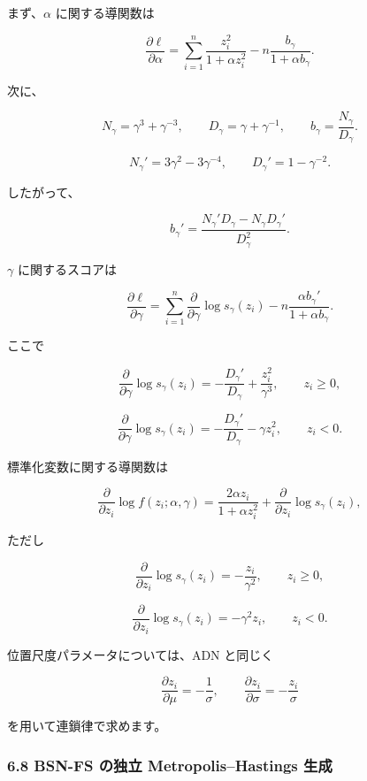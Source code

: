 \documentclass[
]{article}
\begin{document}
まず、\(\alpha\) に関する導関数は

\[
\frac{\partial \ell}{\partial \alpha}
=\sum_{i=1}^{n}\frac{z_i^2}{1+\alpha z_i^2}
-n\frac{b_\gamma}{1+\alpha b_\gamma}.
\]

次に、

\[
N_\gamma=\gamma^3+\gamma^{-3},
\qquad
D_\gamma=\gamma+\gamma^{-1},
\qquad
b_\gamma=\frac{N_\gamma}{D_\gamma}.
\]

\[
N_\gamma'=3\gamma^2-3\gamma^{-4},
\qquad
D_\gamma'=1-\gamma^{-2}.
\]

したがって、

\[
b_\gamma'
=\frac{N_\gamma'D_\gamma-N_\gamma D_\gamma'}{D_\gamma^2}.
\]

\(\gamma\) に関するスコアは

\[
\frac{\partial \ell}{\partial \gamma}
=\sum_{i=1}^{n}\frac{\partial}{\partial\gamma}\log s_\gamma(z_i)
-n\frac{\alpha b_\gamma'}{1+\alpha b_\gamma}.
\]

ここで

\[
\frac{\partial}{\partial\gamma}\log s_\gamma(z_i)
= -\frac{D_\gamma'}{D_\gamma}+\frac{z_i^2}{\gamma^3},
\qquad z_i\ge0,
\]

\[
\frac{\partial}{\partial\gamma}\log s_\gamma(z_i)
= -\frac{D_\gamma'}{D_\gamma}-\gamma z_i^2,
\qquad z_i<0.
\]

標準化変数に関する導関数は

\[
\frac{\partial}{\partial z_i}\log f(z_i;\alpha,\gamma)
=\frac{2\alpha z_i}{1+\alpha z_i^2}
+\frac{\partial}{\partial z_i}\log s_\gamma(z_i),
\]

ただし

\[
\frac{\partial}{\partial z_i}\log s_\gamma(z_i)=
-\frac{z_i}{\gamma^2},\qquad z_i\ge0,
\]

\[
\frac{\partial}{\partial z_i}\log s_\gamma(z_i)=
-\gamma^2 z_i,
\qquad z_i<0.
\]

位置尺度パラメータについては、ADN と同じく

\[
\frac{\partial z_i}{\partial\mu}=-\frac{1}{\sigma},
\qquad
\frac{\partial z_i}{\partial\sigma}=-\frac{z_i}{\sigma}
\]

を用いて連鎖律で求めます。

\hypertarget{bsn-fs-ux306eux72ecux7acb-metropolishastings-ux751fux6210}{%
\subsubsection{6.8 BSN-FS の独立 Metropolis--Hastings
生成}\label{bsn-fs-ux306eux72ecux7acb-metropolishastings-ux751fux6210}}
\end{document}
